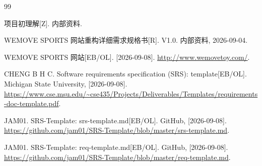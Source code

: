 \clearpage
\begingroup
\renewcommand{\refname}{参考文献}
\begin{thebibliography}{99}
{}
\raggedright
\setlength{\itemsep}{0.85em}
\setlength{\parsep}{0pt}

项目初理解[Z]. 内部资料.

WEMOVE SPORTS 网站重构详细需求规格书[R]. V1.0. 内部资料, 2026-09-04.

WEMOVE SPORTS 网站[EB/OL]. [2026-09-08]. \url{http://www.wemovetoy.com/}.

CHENG B H C. Software requirements specification (SRS): template[EB/OL]. Michigan State University, [2026-09-08]. \url{https://www.cse.msu.edu/~cse435/Projects/Deliverables/Templates/requirements-doc-template.pdf}.

JAM01. SRS-Template: srs-template.md[EB/OL]. GitHub, [2026-09-08]. \url{https://github.com/jam01/SRS-Template/blob/master/srs-template.md}.

JAM01. SRS-Template: req-template.md[EB/OL]. GitHub, [2026-09-08]. \url{https://github.com/jam01/SRS-Template/blob/master/req-template.md}.

\end{thebibliography}
\endgroup

